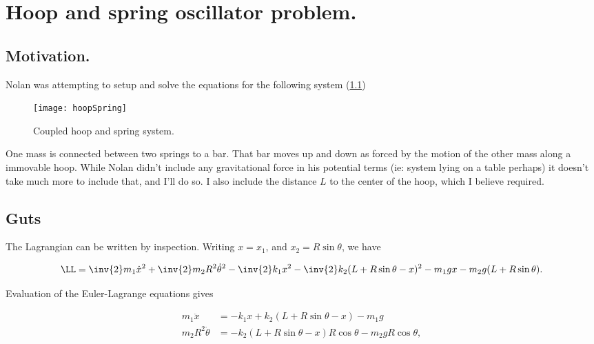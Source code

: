
%

\chapter{Hoop and spring oscillator problem.}
\label{chap:hoopSpring}
{}
\date{June 19, 2010}

\beginArtNoToc

\section{Motivation.}

Nolan was attempting to setup and solve the equations for the following system (\ref{fig:hoopSpring})

\begin{figure}[htp]
\centering
\texttt{[image: hoopSpring]}
\caption{Coupled hoop and spring system.}\label{fig:hoopSpring}
\end{figure}

One mass is connected between two springs to a bar.  That bar moves up and down as forced by the motion of the other mass along a immovable hoop.  While Nolan didn't include any gravitational force in his potential terms (ie: system lying on a table perhaps) it doesn't take much more to include that, and I'll do so.  I also include the distance $L$ to the center of the hoop, which I believe required.

\section{Guts}

The Lagrangian can be written by inspection.  Writing $x = x_1$, and $x_2 = R \sin\theta$, we have

\begin{align}\label{eqn:hoopSpring:1}
\LL = 
\inv{2} m_1 \dot{x}^2 
+ \inv{2} m_2 R^2 \dot{\theta}^2 
- \inv{2} k_1 x^2 
- \inv{2} k_2 ( L + R \sin\theta - x )^2
- m_1 g x
- m_2 g ( L + R \sin\theta).
\end{align}

Evaluation of the Euler-Lagrange equations gives

\begin{subequations}
\label{eqn:hoopSpring:2}
\begin{align}
m_1 \ddot{x} &= - k_1 x + k_2 ( L + R \sin\theta - x ) - m_1 g \\
m_2 R^2 \ddot{\theta} &= - k_2 ( L + R \sin\theta - x ) R \cos\theta - m_2 g R \cos\theta,
\end{align}
\end{subequations}

